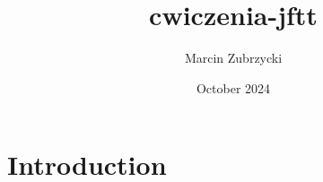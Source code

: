 \documentclass{article}
\title{cwiczenia-jftt}
\author{Marcin Zubrzycki}
\date{October 2024}
\begin{document}
\maketitle

\section{Introduction}
\end{document}
